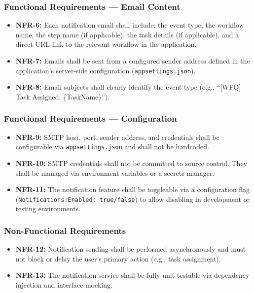 \documentclass[12pt]{article}
\begin{document}
\subsubsection{Functional Requirements --- Email Content}
\begin{itemize}
    \item \textbf{NFR-6:} Each notification email shall include: the event type, the
    workflow name, the step name (if applicable), the task details (if applicable), and a
    direct URL link to the relevant workflow in the application.
    \item \textbf{NFR-7:} Emails shall be sent from a configured sender address defined in
    the application's server-side configuration (\texttt{appsettings.json}).
    \item \textbf{NFR-8:} Email subjects shall clearly identify the event type (e.g.,
    ``[WFQ] Task Assigned: \{TaskName\}'').
\end{itemize}

\subsubsection{Functional Requirements --- Configuration}
\begin{itemize}
    \item \textbf{NFR-9:} SMTP host, port, sender address, and credentials shall be
    configurable via \texttt{appsettings.json} and shall not be hardcoded.
    \item \textbf{NFR-10:} SMTP credentials shall not be committed to source control.
    They shall be managed via environment variables or a secrets manager.
    \item \textbf{NFR-11:} The notification feature shall be toggleable via a configuration
    flag (\texttt{Notifications:Enabled: true/false}) to allow disabling in development or
    testing environments.
\end{itemize}

\subsubsection{Non-Functional Requirements}
\begin{itemize}
    \item \textbf{NFR-12:} Notification sending shall be performed asynchronously and must
    not block or delay the user's primary action (e.g., task assignment).
    \item \textbf{NFR-13:} The notification service shall be fully unit-testable via
    dependency injection and interface mocking.
\end{itemize}
\end{document}
